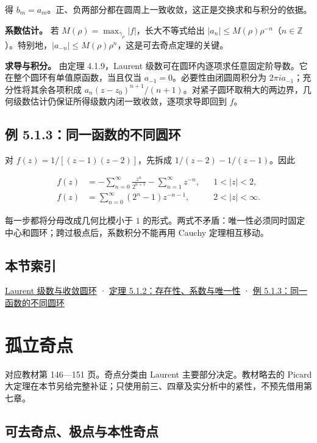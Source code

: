 \documentclass[11pt,a4paper]{article}
\begin{document}
得
\(b_m=a_m\)。正、负两部分都在圆周上一致收敛，这正是交换求和与积分的依据。

\textbf{系数估计。} 若 \(M(\rho)=\max_{\gamma_\rho}|f|\)，长大不等式给出
\(|a_n|\le M(\rho)\rho^{-n}\)（\(n\in\mathbb Z\)）。特别地，\(|a_{-n}|\le M(\rho)\rho^n\)，这是可去奇点定理的关键。

\textbf{求导与积分。} 由定理 4.1.9，Laurent
级数可在圆环内逐项求任意固定阶导数。它在整个圆环有单值原函数，当且仅当
\(a_{-1}=0\)。必要性由闭圆周积分为
\(2\pi i a_{-1}\)；充分性将其余各项积成
\(a_n(z-z_0)^{n+1}/(n+1)\)。对紧子圆环取稍大的两边界，几何级数估计仍保证所得级数内闭一致收敛，逐项求导即回到
\(f\)。

\subsection{例 5.1.3：同一函数的不同圆环}\label{ch05-s1-heading-3}

对 \(f(z)=1/[(z-1)(z-2)]\)，先拆成 \(1/(z-2)-1/(z-1)\)。因此

\[
\begin{aligned}
f(z)&=-\sum_{n=0}^{\infty}\frac{z^n}{2^{n+1}}-\sum_{n=1}^{\infty}z^{-n},&&1<|z|<2,\\
f(z)&=\sum_{n=0}^{\infty}(2^n-1)z^{-n-1},&&2<|z|<\infty.
\end{aligned}
\]

每一步都将分母改成几何比模小于 \(1\)
的形式。两式不矛盾：唯一性必须同时固定中心和圆环；跨过极点后，系数积分不能再用
Cauchy 定理相互移动。

\subsection{本节索引}\label{ch05-s1-heading-4}

\hyperref[ch05-s1-heading-1]{Laurent 级数与收敛圆环} · \hyperref[ch05-s1-heading-2]{定理
5.1.2：存在性、系数与唯一性} · \hyperref[ch05-s1-heading-3]{例
5.1.3：同一函数的不同圆环}

\section{孤立奇点}
对应教材第 146---151 页。奇点分类由 Laurent 主要部分决定。教材略去的
Picard
大定理在本节另给完整补证；只使用前三、四章及实分析中的紧性，不预先借用第七章。

\subsection{可去奇点、极点与本性奇点}\label{ch05-s2-heading-1}
\end{document}
